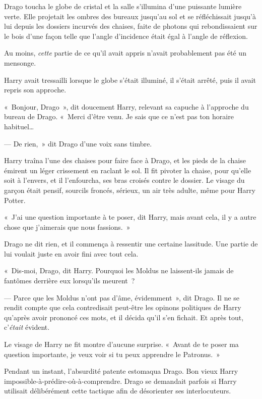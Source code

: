 Drago toucha le globe de cristal et la salle s'illumina d'une puissante lumière verte.
Elle projetait les ombres des bureaux jusqu'au sol et se réfléchissait jusqu'à lui depuis les dossiers incurvés des chaises, faite de photons qui rebondissaient sur le bois d'une façon telle que l'angle d'incidence était égal à l'angle de réflexion.

Au moins, \emph{cette} partie de ce qu'il avait appris n'avait probablement pas été un mensonge.

Harry avait tressailli lorsque le globe s'était illuminé, il s'était arrêté, puis il avait repris son approche.

«~Bonjour, Drago~», dit doucement Harry, relevant sa capuche à l'approche du bureau de Drago.
«~Merci d'être venu.
Je sais que ce n'est pas ton horaire habituel…

--- De rien,~» dit Drago d'une voix sans timbre.

Harry traîna l'une des chaises pour faire face à Drago, et les pieds de la chaise émirent un léger crissement en raclant le sol.
Il fit pivoter la chaise, pour qu'elle soit à l'envers, et il l'enfourcha, ses bras croisés contre le dossier.
Le visage du garçon était pensif, sourcils froncés, sérieux, un air très adulte, même pour Harry Potter.

«~J'ai une question importante à te poser, dit Harry, mais avant cela, il y a autre chose que j'aimerais que nous fassions.~»

Drago ne dit rien, et il commença à ressentir une certaine lassitude.
Une partie de lui voulait juste en avoir fini avec tout cela.

«~Dis-moi, Drago, dit Harry.
Pourquoi les Moldus ne laissent-ils jamais de fantômes derrière eux lorsqu'ils meurent~?

--- Parce que les Moldus n'ont pas d'âme, évidemment~», dit Drago.
Il ne se rendit compte que cela contredisait peut-être les opinons politiques de Harry qu'après avoir prononcé ces mots, et il décida qu'il s'en fichait.
Et après tout, c'\emph{était} évident.

Le visage de Harry ne fit montre d'aucune surprise.
«~Avant de te poser ma question importante, je veux voir si tu peux apprendre le Patronus.~»

Pendant un instant, l'absurdité patente estomaqua Drago.
Bon vieux Harry impossible-à-prédire-où-à-comprendre.
Drago se demandait parfois si Harry utilisait délibérément cette tactique afin de désorienter ses interlocuteurs.

